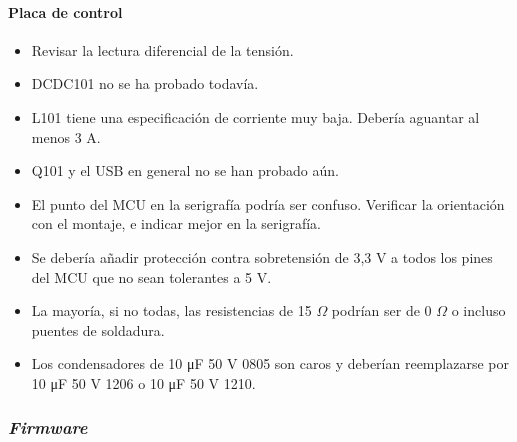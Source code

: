 \paragraph*{Placa de control}
\begin{itemize}
	\item Revisar la lectura diferencial de la tensión.
	\item DCDC101 no se ha probado todavía.
	\item L101 tiene una especificación de corriente muy baja. Debería aguantar al menos 3 A.
	\item Q101 y el USB en general no se han probado aún.
	\item El punto del MCU en la serigrafía podría ser confuso. Verificar la orientación con el montaje, e indicar mejor en la serigrafía.
	\item Se debería añadir protección contra sobretensión de 3,3 V a todos los pines del MCU que no sean tolerantes a 5 V.
	\item La mayoría, si no todas, las resistencias de 15 $\Omega$ podrían ser de 0 $\Omega$ o incluso puentes de soldadura.
	\item Los condensadores de 10 \unit{\micro\farad} 50 V 0805 son caros y deberían reemplazarse por 10 \unit{\micro\farad} 50 V 1206 o 10 \unit{\micro\farad} 50 V 1210.
\end{itemize}

\subsubsection*{\textit{Firmware}}

